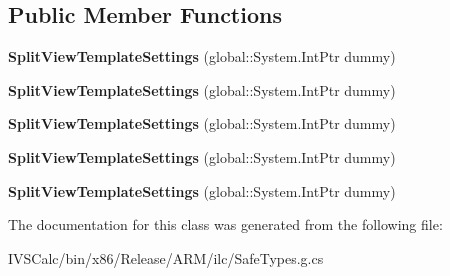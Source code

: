 \subsection*{Public Member Functions}
\begin{DoxyCompactItemize}
\item 
\mbox{\label{class_windows_1_1_u_i_1_1_xaml_1_1_controls_1_1_primitives_1_1_split_view_template_settings_a4f19540ca4d044d099c8bee71164b946}} 
{\bfseries Split\+View\+Template\+Settings} (global\+::\+System.\+Int\+Ptr dummy)
\item 
\mbox{\label{class_windows_1_1_u_i_1_1_xaml_1_1_controls_1_1_primitives_1_1_split_view_template_settings_a4f19540ca4d044d099c8bee71164b946}} 
{\bfseries Split\+View\+Template\+Settings} (global\+::\+System.\+Int\+Ptr dummy)
\item 
\mbox{\label{class_windows_1_1_u_i_1_1_xaml_1_1_controls_1_1_primitives_1_1_split_view_template_settings_a4f19540ca4d044d099c8bee71164b946}} 
{\bfseries Split\+View\+Template\+Settings} (global\+::\+System.\+Int\+Ptr dummy)
\item 
\mbox{\label{class_windows_1_1_u_i_1_1_xaml_1_1_controls_1_1_primitives_1_1_split_view_template_settings_a4f19540ca4d044d099c8bee71164b946}} 
{\bfseries Split\+View\+Template\+Settings} (global\+::\+System.\+Int\+Ptr dummy)
\item 
\mbox{\label{class_windows_1_1_u_i_1_1_xaml_1_1_controls_1_1_primitives_1_1_split_view_template_settings_a4f19540ca4d044d099c8bee71164b946}} 
{\bfseries Split\+View\+Template\+Settings} (global\+::\+System.\+Int\+Ptr dummy)
\end{DoxyCompactItemize}


The documentation for this class was generated from the following file\+:\begin{DoxyCompactItemize}
\item 
I\+V\+S\+Calc/bin/x86/\+Release/\+A\+R\+M/ilc/Safe\+Types.\+g.\+cs\end{DoxyCompactItemize}
